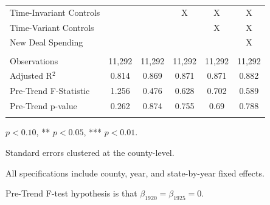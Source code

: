 \documentclass[12pt]{article}
\begin{document}
\begin{table}
\begin{threeparttable}[t]
\begin{tabular}{@{\extracolsep{5pt}}lccccc}
    Time-Invariant Controls &  &  & X & X & X \\ 
    Time-Variant Controls &  &  &  & X & X \\ 
    New Deal Spending &  &  &  &  & X \\ 
    \hline \\[-1.8ex] 
    Observations & 11,292 & 11,292 & 11,292 & 11,292 & 11,292 \\ 
    Adjusted R$^{2}$ & 0.814 & 0.869 & 0.871 & 0.871 & 0.882 \\ 
    Pre-Trend F-Statistic & 1.256 & 0.476 & 0.628 & 0.702 & 0.589 \\ 
    Pre-Trend p-value & 0.262 & 0.874 & 0.755 & 0.69 & 0.788 \\ 
    \hline 
    \hline \\[-1.8ex] 

\end{tabular}
\begin{tablenotes}
    \item {\footnotesize * \(p<0.10\), ** \(p<0.05\), *** \(p<0.01\).}
    \item {\footnotesize Standard errors clustered at the county-level.}
    \item {\footnotesize All specifications include county, year, and state-by-year fixed effects.}
    \item {\footnotesize Pre-Trend F-test hypothesis is that $\beta_{1920} = \beta_{1925}=0$.}

    \end{tablenotes}
\end{threeparttable} 
\end{table}
\end{document}
